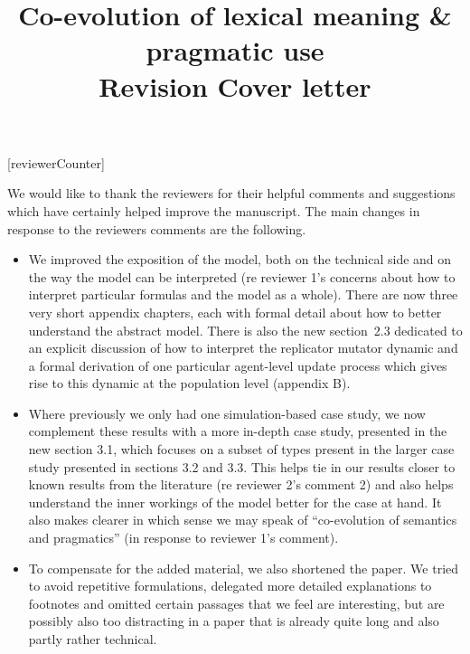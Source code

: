 \documentclass[12pt,a4paper]{article}
\begin{document}
[reviewerCounter]
	\date{}

\newcommand{\mf}[1]{\textcolor{Red}{[MF: #1]}} 
\newcommand{\tb}[1]{\textcolor[rgb]{.8,.33,.0}{[TB: #1]}}%
\newcommand{\rvv}[1]{\textcolor{Steelblue}{#1}}%

\title{\Large Co-evolution of lexical meaning \& pragmatic use\\ {\bf Revision Cover letter}}

	\maketitle
\normalsize

We would like to thank the reviewers for their helpful comments and suggestions which have
certainly helped improve the manuscript. The main changes in response to the reviewers comments
are the following. 

\begin{itemize}
\item We improved the exposition of the model, both on the technical side and on
  the way the model can be interpreted (re reviewer 1's concerns about how to interpret
  particular formulas and the model as a whole). There are now three very short appendix
  chapters, each with formal detail about how to better understand the abstract model. There is
  also the new section~2.3 dedicated to an explicit discussion of how to interpret the replicator
  mutator dynamic and a formal derivation of one particular agent-level update process which
  gives rise to this dynamic at the population level (appendix B).
\item Where previously we only had one simulation-based case study, we now complement these
  results with a more in-depth case study, presented in the new section 3.1, which focuses on a
  subset of types present in the larger case study presented in sections 3.2 and 3.3. This
  helps tie in our results closer to known results from the literature (re reviewer 2's comment
  2) and also helps understand the inner workings of the model better for the case at hand. It
  also makes clearer in which sense we may speak of ``co-evolution of semantics and
  pragmatics'' (in response to reviewer 1's comment).
\item To compensate for the added material, we also shortened the paper. We tried to
  avoid repetitive formulations, delegated more detailed explanations to footnotes and omitted
  certain passages that we feel are interesting, but are possibly also too distracting in a
  paper that is already quite long and also partly rather technical.
\end{itemize}
\end{document}
